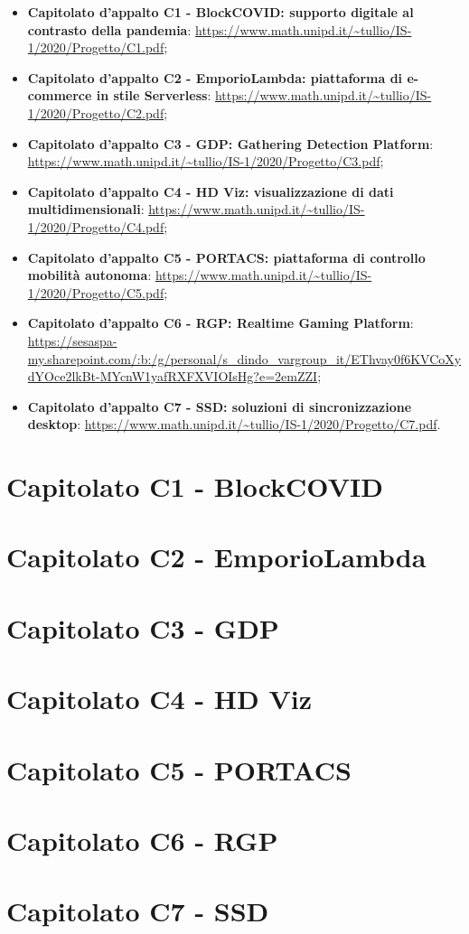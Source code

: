 \documentclass{article}
\begin{document}
\begin{itemize}
  \item \textbf{Capitolato d'appalto C1 - BlockCOVID: supporto digitale al contrasto della pandemia}: \url{https://www.math.unipd.it/~tullio/IS-1/2020/Progetto/C1.pdf};
  \item \textbf{Capitolato d'appalto C2 - EmporioLambda: piattaforma di e-commerce in stile Serverless}: \url{https://www.math.unipd.it/~tullio/IS-1/2020/Progetto/C2.pdf};
  \item \textbf{Capitolato d'appalto C3 - GDP: Gathering Detection Platform}: \url{https://www.math.unipd.it/~tullio/IS-1/2020/Progetto/C3.pdf};
  \item \textbf{Capitolato d'appalto C4 - HD Viz: visualizzazione di dati multidimensionali}: \url{https://www.math.unipd.it/~tullio/IS-1/2020/Progetto/C4.pdf};
  \item \textbf{Capitolato d'appalto C5 - PORTACS: piattaforma di controllo mobilità autonoma}: \url{https://www.math.unipd.it/~tullio/IS-1/2020/Progetto/C5.pdf};
  \item \textbf{Capitolato d'appalto C6 - RGP: Realtime Gaming Platform}: \url{https://sesaspa-my.sharepoint.com/:b:/g/personal/s_dindo_vargroup_it/EThvay0f6KVCoXydYOce2lkBt-MYcnW1yafRXFXVIOIsHg?e=2emZZI};
  \item \textbf{Capitolato d'appalto C7 - SSD: soluzioni di sincronizzazione desktop}: \url{https://www.math.unipd.it/~tullio/IS-1/2020/Progetto/C7.pdf}.
\end{itemize}

\newpage
\section{Capitolato C1 - BlockCOVID}
\label{sec:c1}


\newpage
\section{Capitolato C2 - EmporioLambda}
\label{sec:c2}


\newpage
\section{Capitolato C3 - GDP}
\label{sec:c3}


\newpage
\section{Capitolato C4 - HD Viz}
\label{sec:c4}


\newpage
\section{Capitolato C5 - PORTACS}
\label{sec:c5}


\newpage
\section{Capitolato C6 - RGP}
\label{sec:c6}


\newpage
\section{Capitolato C7 - SSD}
\label{sec:c7}

\end{document}
